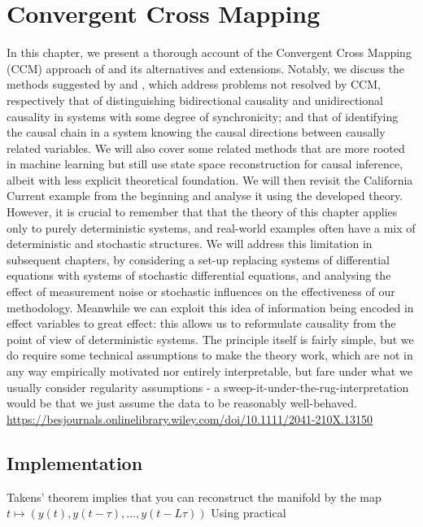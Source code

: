 \documentclass[11pt, a4paper]{memoir}
\theoremstyle{break}
\theoremstyle{break}
\theoremstyle{nonumberplain}
\begin{document}
\chapter{Convergent Cross Mapping}\label{chapTaken}
In this chapter, we present a thorough account of the Convergent Cross Mapping (CCM) approach of \cite{Sugihara} and its alternatives and extensions. Notably, we discuss the methods suggested by \cite{Ye2015} and \cite{Leng2020}, which address problems not resolved by CCM, respectively that of distinguishing bidirectional causality and unidirectional causality in systems with some degree of synchronicity; and that of identifying the causal chain in a system knowing the causal directions between causally related variables. We will also cover some related methods that are more rooted in machine learning but still use state space reconstruction for causal inference, albeit with less explicit theoretical foundation. We will then revisit the California Current example from the beginning and analyse it using the developed theory. However, it is crucial to remember that that the theory of this chapter applies only to purely deterministic systems, and real-world examples often have a mix of deterministic and stochastic structures. We will address this limitation in subsequent chapters, by considering a set-up replacing systems of differential equations with systems of stochastic differential equations, and analysing the effect of measurement noise or stochastic influences on the effectiveness of our methodology.
Meanwhile we can exploit this idea of information being encoded in effect variables to great effect: this allows us to reformulate causality from the point of view of deterministic systems. The principle itself is fairly simple, but we do require some technical assumptions to make the theory work, which are not in any way empirically motivated nor entirely interpretable, but fare under what we usually consider regularity assumptions - a sweep-it-under-the-rug-interpretation would be that we just assume the data to be reasonably well-behaved. 
\url{https://besjournals.onlinelibrary.wiley.com/doi/10.1111/2041-210X.13150}

\section{Implementation}
Takens' theorem implies that you can reconstruct the manifold by the map
$t\mapsto (y(t),y(t-\tau),...,y(t-L\tau))$
Using practical  
\end{document}
